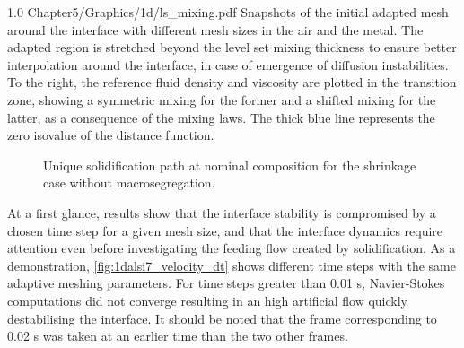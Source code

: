 \begin{figureth}
{1.0}
{Chapter5/Graphics/1d/ls_mixing.pdf}
{Snapshots of the initial adapted mesh around the interface with different mesh sizes in the air and the metal. The adapted region
is stretched beyond the level set mixing thickness to ensure better interpolation around the interface, in case of emergence of diffusion
instabilities. To the right, the reference fluid density and viscosity are plotted in the transition zone, showing a symmetric mixing for the former
and a shifted mixing for the latter, as a consequence of the mixing laws.
The thick blue line represents the zero isovalue of the distance function.}
\label{fig:1dalsi7_lsmixing}
\end{figureth}

\begin{figure}[htbp]
\centering
{}

\caption{Unique solidification path at nominal composition for the shrinkage case without macrosegregation.}
\label{fig:shrinkage_nomacro_sp}
\end{figure}

At a first glance, results show that the interface stability is compromised by a chosen time step for a given mesh size, and that the interface dynamics
require attention even before investigating the feeding flow created by solidification. As a demonstration, \cref{fig:1dalsi7_velocity_dt} shows different
time steps with the same adaptive meshing parameters. For time steps greater than 0.01 s, Navier-Stokes computations did not converge resulting in an high artificial 
flow quickly destabilising the interface. It should be noted that the frame corresponding to 0.02 s was taken at an earlier time than the two other frames.


